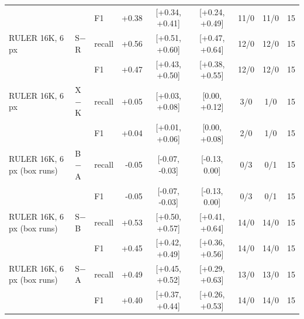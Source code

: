 \begin{table}[!htbp]
\begin{tabular}{l l l r c c c c r}
 &  & F1 & +0.38 & [+0.34, +0.41] & [+0.24, +0.49] & 11/0 & 11/0 & 15 \\
RULER 16K, 6\,px & S$-$R & recall & +0.56 & [+0.51, +0.60] & [+0.47, +0.64] & 12/0 & 12/0 & 15 \\
 &  & F1 & +0.47 & [+0.43, +0.50] & [+0.38, +0.55] & 12/0 & 12/0 & 15 \\
RULER 16K, 6\,px & X$-$K & recall & +0.05 & [+0.03, +0.08] & [0.00, +0.12] & 3/0 & 1/0 & 15 \\
 &  & F1 & +0.04 & [+0.01, +0.06] & [0.00, +0.08] & 2/0 & 1/0 & 15 \\
RULER 16K, 6\,px (box runs) & B$-$A & recall & -0.05 & [-0.07, -0.03] & [-0.13, 0.00] & 0/3 & 0/1 & 15 \\
 &  & F1 & -0.05 & [-0.07, -0.03] & [-0.13, 0.00] & 0/3 & 0/1 & 15 \\
RULER 16K, 6\,px (box runs) & S$-$B & recall & +0.53 & [+0.50, +0.57] & [+0.41, +0.64] & 14/0 & 14/0 & 15 \\
 &  & F1 & +0.45 & [+0.42, +0.49] & [+0.36, +0.56] & 14/0 & 14/0 & 15 \\
RULER 16K, 6\,px (box runs) & S$-$A & recall & +0.49 & [+0.45, +0.52] & [+0.29, +0.63] & 13/0 & 13/0 & 15 \\
 &  & F1 & +0.40 & [+0.37, +0.44] & [+0.26, +0.53] & 14/0 & 14/0 & 15 \\
\bottomrule
\end{tabular}
\end{table}

